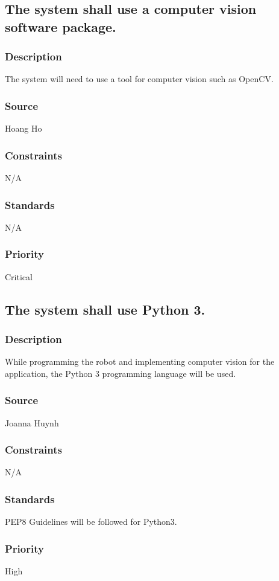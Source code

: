 \subsection{The system shall use a computer vision software package.}
\subsubsection{Description}
The system will need to use a tool for computer vision such as OpenCV.
\subsubsection{Source}
Hoang Ho
\subsubsection{Constraints}
N/A
\subsubsection{Standards}
N/A
\subsubsection{Priority}
Critical

\subsection{The system shall use Python 3.}
\subsubsection{Description}
While programming the robot and implementing computer vision for the application, the Python 3 programming language will be used.
\subsubsection{Source}
Joanna Huynh
\subsubsection{Constraints}
N/A
\subsubsection{Standards}
PEP8 Guidelines will be followed for Python3.
\subsubsection{Priority}
High

